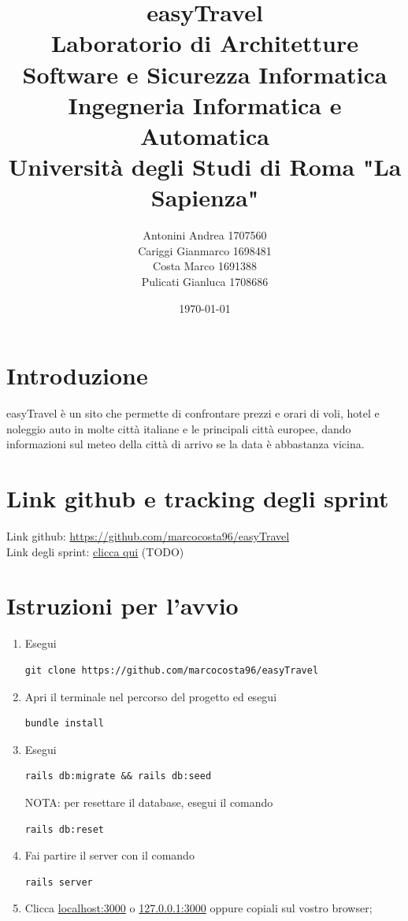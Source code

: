 \documentclass[11pt]{article}
\title{\textbf{easyTravel} \\ \bigskip \large Laboratorio di Architetture Software e Sicurezza Informatica \\ Ingegneria Informatica e Automatica \\ Università degli Studi di Roma "La Sapienza"}
\author{Antonini Andrea 1707560\\Cariggi Gianmarco 1698481\\Costa Marco 1691388\\Pulicati Gianluca 1708686}
\date{\today}
\begin{document}
\maketitle

\pagebreak

\tableofcontents

\pagebreak

\section{Introduzione}

easyTravel è un sito che permette di confrontare prezzi e orari di voli, hotel e noleggio auto in molte
città italiane e le principali città europee, dando informazioni sul meteo della città di arrivo se la data è abbastanza vicina.


\section{Link github e tracking degli sprint}

Link github: \href{https://github.com/marcocosta96/easyTravel}{https://github.com/marcocosta96/easyTravel} \\
Link degli sprint: \href{https://docs.google.com/spreadsheets/d/14VnUUgNbMTW1_EG6KlEAEggAsf6aBKnaC1etXz5ji0I/edit#gid=12}{clicca qui} (TODO) %


\section{Istruzioni per l'avvio}

\begin{enumerate}
	\item Esegui \begin{verbatim}git clone https://github.com/marcocosta96/easyTravel\end{verbatim}
	\item Apri il terminale nel percorso del progetto ed esegui \begin{verbatim}bundle install\end{verbatim}
	\item Esegui \begin{verbatim}rails db:migrate && rails db:seed\end{verbatim} NOTA: per resettare il database, esegui il comando \begin{verbatim}rails db:reset\end{verbatim}
	\item Fai partire il server con il comando \begin{verbatim}rails server\end{verbatim}
	\item Clicca \href{localhost:3000}{localhost:3000} o \href{127.0.0.1:3000}{127.0.0.1:3000} oppure copiali sul vostro browser;
\end{enumerate}
\end{document}
